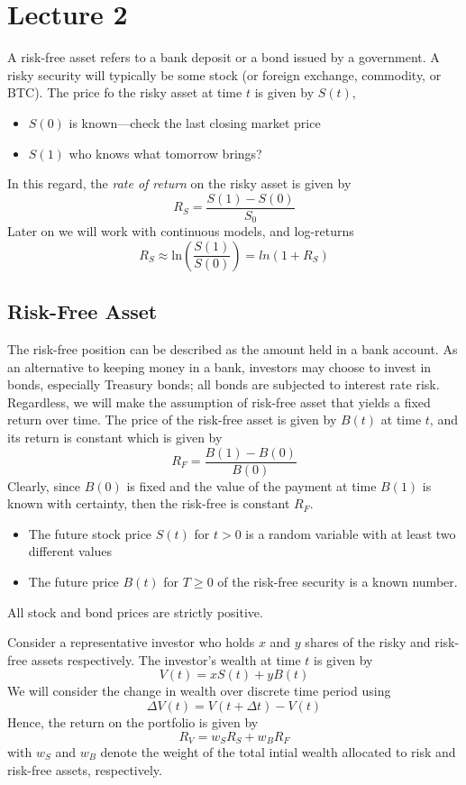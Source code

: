 \documentclass{article}
\begin{document}
\section{Lecture 2}

A risk-free asset refers to a bank deposit or a bond issued by a government. A risky security will typically be some stock (or foreign exchange, commodity, or BTC). The price fo the risky asset at time $t$ is given by $S(t)$, 
\begin{itemize}
  \item $S(0)$ is known---check the last closing market price 
  \item $S(1)$ who knows what tomorrow brings?
\end{itemize}
In this regard, the \emph{rate of return} on the risky asset is given by $$R_S = \frac{S(1) - S(0)}{S_0}$$ Later on we will work with continuous models, and log-returns $$R_S \approx \textrm{ln}(\frac{S(1)}{S(0)}) = ln(1 + R_S )$$ 

\subsection{Risk-Free Asset}

The risk-free position can be described as the amount held in a bank account. As an alternative to keeping money in a bank, investors may choose to invest in bonds, especially Treasury bonds; all bonds are subjected to interest rate risk. Regardless, we will make the assumption of risk-free asset that yields a fixed return over time. The price of the risk-free asset is given by $B(t)$ at time $t$, and its return is constant which is given by $$R_F = \frac{B(1) - B(0)}{B(0)}$$ Clearly, since $B(0)$ is fixed and the value of the payment at time $B(1)$ is known with certainty, then the risk-free is constant $R_F$.  
\begin{itemize}
  \item The future stock price $S(t)$ for $t>0$ is a random variable with at least two different values 
  \item The future price $B(t)$ for $T \geq 0$ of the risk-free security is a known number. 
\end{itemize}

\begin{remark}
  All stock and bond prices are strictly positive.
\end{remark}

Consider a representative investor who holds $x$ and $y$ shares of the risky and risk-free assets respectively. The investor's wealth at time $t$ is given by $$V(t) = xS(t) + yB(t)$$ We will consider the change in wealth over discrete time period using $$\Delta V(t) = V(t + \Delta t) - V(t)$$ Hence, the return on the portfolio is given by $$R_V = w_S R_S + w_B R_F$$ with $w_S$ and $w_B$ denote the weight of the total intial wealth allocated to risk and risk-free assets, respectively. \\ 
\end{document}
